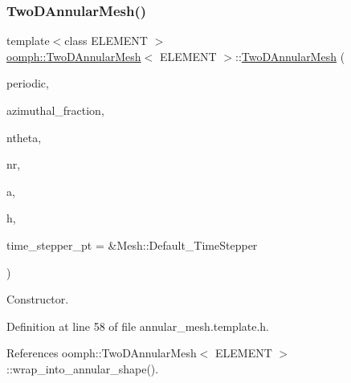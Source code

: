 \subsubsection{\texorpdfstring{Two\+D\+Annular\+Mesh()}{TwoDAnnularMesh()}\hspace{0.1cm}{\footnotesize\ttfamily [1/2]}}
{\footnotesize\ttfamily template$<$class E\+L\+E\+M\+E\+NT $>$ \\
\hyperlink{classoomph_1_1TwoDAnnularMesh}{oomph\+::\+Two\+D\+Annular\+Mesh}$<$ E\+L\+E\+M\+E\+NT $>$\+::\hyperlink{classoomph_1_1TwoDAnnularMesh}{Two\+D\+Annular\+Mesh} (\begin{DoxyParamCaption}\item[{const bool \&}]{periodic,  }\item[{const double \&}]{azimuthal\+\_\+fraction,  }\item[{const unsigned \&}]{ntheta,  }\item[{const unsigned \&}]{nr,  }\item[{const double \&}]{a,  }\item[{const double \&}]{h,  }\item[{Time\+Stepper $\ast$}]{time\+\_\+stepper\+\_\+pt = {\ttfamily \&Mesh\+:\+:Default\+\_\+TimeStepper} }\end{DoxyParamCaption})\hspace{0.3cm}{\ttfamily [inline]}}



Constructor. 



Definition at line 58 of file annular\+\_\+mesh.\+template.\+h.



References oomph\+::\+Two\+D\+Annular\+Mesh$<$ E\+L\+E\+M\+E\+N\+T $>$\+::wrap\+\_\+into\+\_\+annular\+\_\+shape().

\mbox{\label{classoomph_1_1TwoDAnnularMesh_a2d67eba43c6355893c7a95208068d387}} 
